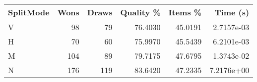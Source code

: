 \begin{tabular}{lrrrrr}
\hline
SplitMode & Wons & Draws & Quality \% & Items \% & Time (s)   \\
\hline
V         & 98   & 79    & 76.4030    & 45.0191  & 2.7157e-03 \\
H         & 70   & 60    & 75.9970    & 45.5439  & 6.2101e-03 \\
M         & 104  & 89    & 79.7175    & 47.6795  & 1.3743e-02 \\
N         & 176  & 119   & 83.6420    & 47.2335  & 7.2176e+00 \\
\hline
\end{tabular}